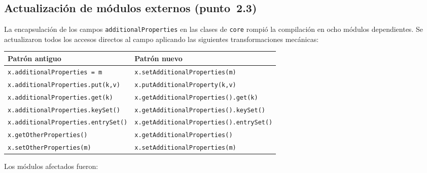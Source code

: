 \documentclass[11pt,a4paper]{article}
\newcommand{\code}[1]{\texttt{#1}}
\begin{document}
\subsection{Actualización de módulos externos (punto~2.3)}

La encapsulación de los campos \code{additionalProperties} en las clases
de \code{core} rompió la compilación en ocho módulos dependientes.
Se actualizaron todos los accesos directos al campo aplicando las
siguientes transformaciones mecánicas:

\begin{center}
\begin{tabular}{ll}
\toprule
\textbf{Patrón antiguo} & \textbf{Patrón nuevo} \\
\midrule
\code{x.additionalProperties = m}             & \code{x.setAdditionalProperties(m)} \\
\code{x.additionalProperties.put(k,v)}        & \code{x.putAdditionalProperty(k,v)} \\
\code{x.additionalProperties.get(k)}          & \code{x.getAdditionalProperties().get(k)} \\
\code{x.additionalProperties.keySet()}        & \code{x.getAdditionalProperties().keySet()} \\
\code{x.additionalProperties.entrySet()}      & \code{x.getAdditionalProperties().entrySet()} \\
\code{x.getOtherProperties()}                 & \code{x.getAdditionalProperties()} \\
\code{x.setOtherProperties(m)}                & \code{x.setAdditionalProperties(m)} \\
\bottomrule
\end{tabular}
\end{center}

Los módulos afectados fueron:
\end{document}
